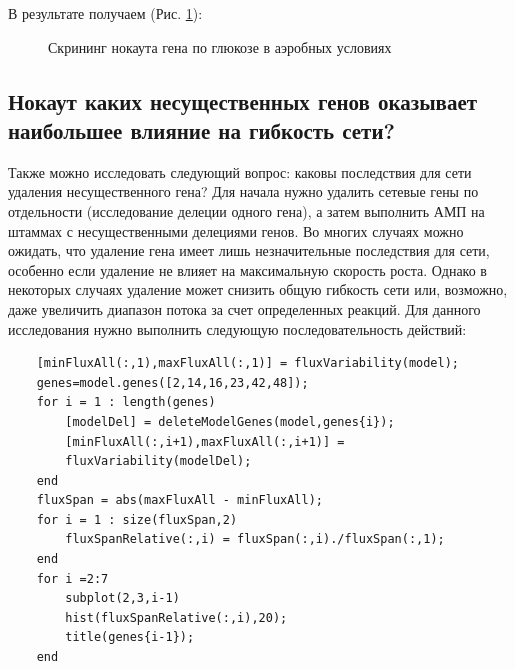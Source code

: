 \documentclass[a4paper, 12pt]{article}
\begin{document}
В результате получаем (Рис. \ref{fig:s_g_k}):
\begin{figure}[H]
    \caption{Скрининг нокаута гена по глюкозе в аэробных условиях}
    \label{fig:s_g_k}
\end{figure}

\subsection{Нокаут каких несущественных генов оказывает наибольшее влияние на гибкость сети?}

Также можно исследовать следующий вопрос: каковы последствия для сети удаления несущественного гена? Для начала нужно удалить сетевые гены по отдельности (исследование делеции одного гена), а затем выполнить АМП на штаммах с несущественными делециями генов. Во многих случаях можно ожидать, что удаление гена имеет лишь незначительные последствия для сети, особенно если удаление не влияет на максимальную скорость роста. Однако в некоторых случаях удаление может снизить общую гибкость сети или, возможно, даже увеличить диапазон потока за счет определенных реакций. Для данного исследования нужно выполнить следующую последовательность действий:
\begin{lstlisting}
    [minFluxAll(:,1),maxFluxAll(:,1)] = fluxVariability(model);
    genes=model.genes([2,14,16,23,42,48]);
    for i = 1 : length(genes)
        [modelDel] = deleteModelGenes(model,genes{i});
        [minFluxAll(:,i+1),maxFluxAll(:,i+1)] =
        fluxVariability(modelDel);
    end
    fluxSpan = abs(maxFluxAll - minFluxAll);
    for i = 1 : size(fluxSpan,2)
        fluxSpanRelative(:,i) = fluxSpan(:,i)./fluxSpan(:,1);
    end
    for i =2:7
        subplot(2,3,i-1)
        hist(fluxSpanRelative(:,i),20);
        title(genes{i-1});
    end
\end{lstlisting}
\end{document}
